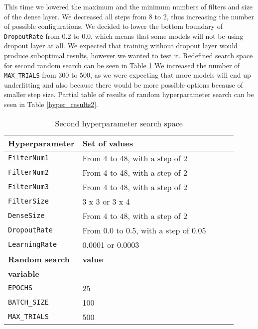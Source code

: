 This time we lowered the maximum and the minimum numbers of filters and size of the dense layer.
We decreased all steps from 8 to 2, thus increasing the number of possible configurations.
We decided to lower the bottom boundary of \verb|DropoutRate| from 0.2 to 0.0, which means that some models will not be using dropout layer at all.
We expected that training without dropout layer would produce suboptimal results, however we wanted to test it.
Redefined search space for second random search can be seen in Table \ref{hyper_table2}
We increased the number of \verb|MAX_TRIALS| from 300 to 500, as we were expecting that more models will end up underfitting and also because there would be more possible options because of smaller step size.
Partial table of results of random hyperparameter search can be seen in Table \ref{hyper_results2}.

\begin{table}[ht]
    \centering
    \caption{ Second hyperparameter search space}
    \begin{tabular}{@{} *5l @{}}    \toprule
        \textbf{Hyperparameter} & \textbf{Set of values}\\\midrule
        \verb|FilterNum1|       & From 4 to 48, with a step of 2\\ 
        \verb|FilterNum2|       & From 4 to 48, with a step of 2\\ 
        \verb|FilterNum3|       & From 4 to 48, with a step of 2\\
        \verb|FilterSize|       & 3 x 3 or 3 x 4\\
        \verb|DenseSize|        & From 4 to 48, with a step of 2\\
        \verb|DropoutRate|      & From 0.0 to 0.5, with a step of 0.05\\
        \verb|LearningRate|     & 0.0001 or 0.0003\\\toprule
        \textbf{Random search}  & \textbf{value}\\
        \textbf{variable}       & \\\midrule
        \verb|EPOCHS|           & 25\\
        \verb|BATCH_SIZE|       & 100\\
        \verb|MAX_TRIALS|       & 500\\\bottomrule
    \end{tabular}
    \label{hyper_table2}
\end{table}

